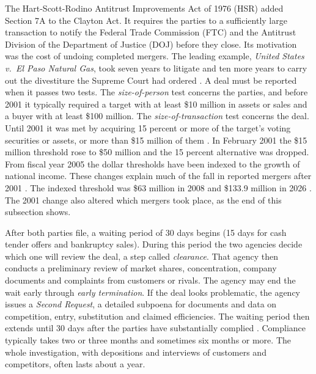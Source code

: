 The Hart-Scott-Rodino Antitrust Improvements Act of 1976 (HSR) added Section 7A to the Clayton Act. It requires
the parties to a sufficiently large transaction to notify the Federal Trade Commission (FTC) and the Antitrust
Division of the Department of Justice (DOJ) before they close. Its motivation was the cost of undoing completed
mergers. The leading example, \emph{United States v.\ El Paso Natural Gas}, took seven years to litigate and ten
more years to carry out the divestiture the Supreme Court had ordered \citep[p.~5]{AshenfelterHosken2008}. A deal
must be reported when it passes two tests. The \emph{size-of-person} test concerns the parties, and before 2001 it
typically required a target with at least \$10 million in assets or sales and a buyer with at least \$100 million.
The \emph{size-of-transaction} test concerns the deal. Until 2001 it was met by acquiring 15 percent or more of the
target's voting securities or assets, or more than \$15 million of them \citep{Wollmann2019}. In February 2001 the
\$15 million threshold rose to \$50 million and the 15 percent alternative was dropped. From fiscal year 2005 the
dollar thresholds have been indexed to the growth of national income. These changes explain much of the fall in reported mergers after 2001
\citep[p.~6, n.~7]{AshenfelterHosken2008}. The indexed threshold was \$63 million in 2008 \citep[p.~2, n.~3]{FarrellShapiro2010} and \$133.9 million in 2026 \citep[p.~2134]{FTC2026}. The 2001
change also altered which mergers took place, as the end of this subsection shows.

After both parties file, a waiting period of 30 days begins (15 days for cash tender offers and bankruptcy
sales). During this period the two agencies decide which one will review the deal, a step called
\emph{clearance}. That agency then conducts a preliminary review of market shares, concentration, company
documents and complaints from customers or rivals. The agency may end the wait early through \emph{early
termination}. If the deal looks problematic, the agency issues a \emph{Second Request}, a detailed subpoena for
documents and data on competition, entry, substitution and claimed efficiencies. The waiting period then extends
until 30 days after the parties have substantially complied \citep[p.~6]{AshenfelterHosken2008}. Compliance
typically takes two or three months and sometimes six months or more. The whole investigation, with depositions
and interviews of customers and competitors, often lasts about a year.

